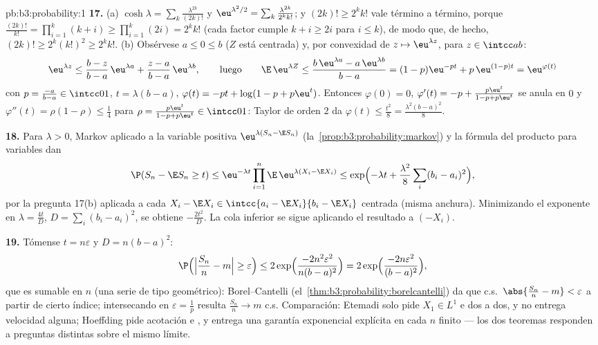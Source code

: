\begin{solution}{pb:b3:probability:1}
\textbf{17.} (a) $\cosh\lambda =
\sum_k\frac{\lambda^{2k}}{(2k)!}$ y $\eu^{\lambda^2/2} =
\sum_k\frac{\lambda^{2k}}{2^kk!}$; y $(2k)! \geq 2^kk!$ vale término a
término, porque $\frac{(2k)!}{k!} =
\prod_{i=1}^k(k + i) \geq \prod_{i=1}^k(2i) = 2^kk!$ (cada factor cumple
$k + i \geq 2i$ para $i \leq k$), de modo que, de hecho,
$(2k)! \geq 2^k(k!)^2 \geq 2^kk!$. (b) Obsérvese $a \leq 0 \leq b$ ($Z$
está centrada) y, por convexidad de $z \mapsto \eu^{\lambda z}$, para
$z \in \intcc ab$:
\[
\eu^{\lambda z} \leq \frac{b - z}{b - a}\,\eu^{\lambda a} +
\frac{z - a}{b - a}\,\eu^{\lambda b},
\qquad\text{luego}\qquad
\E\,\eu^{\lambda Z} \leq \frac{b\,\eu^{\lambda a} -
a\,\eu^{\lambda b}}{b - a}
= (1 - p)\eu^{-pt} + p\,\eu^{(1-p)t} = \eu^{\varphi(t)}
\]
con $p = \frac{-a}{b-a} \in \intcc01$, $t = \lambda(b -
a)$, $\varphi(t) = -pt + \log(1 - p + p\eu^t)$. Entonces
$\varphi(0) = 0$, $\varphi'(t) = -p + \frac{p\eu^t}{1 - p +
p\eu^t}$ se anula en $0$ y $\varphi''(t) = \rho(1 -
\rho) \leq \frac14$ para $\rho = \frac{p\eu^t}{1 - p +
p\eu^t} \in \intcc01$: Taylor de orden $2$ da
$\varphi(t) \leq \frac{t^2}8 = \frac{\lambda^2(b-a)^2}8$.

\textbf{18.} Para $\lambda > 0$, Markov aplicado a la variable positiva
$\eu^{\lambda(S_n - \E S_n)}$ (la~\cref{prop:b3:probability:markov}) y
la fórmula del producto para variables
 dan
\[
\P(S_n - \E S_n \geq t) \leq \eu^{-\lambda
t}\prod_{i=1}^n\E\,\eu^{\lambda(X_i - \E X_i)}
\leq \exp\Bigl(-\lambda t +
\frac{\lambda^2}8\sum_i(b_i - a_i)^2\Bigr),
\]
por la pregunta 17(b) aplicada a cada $X_i - \E X_i
\in \intcc{a_i - \E X_i}{b_i - \E X_i}$ centrada (misma anchura).
Minimizando el exponente en $\lambda = \frac{4t}{D}$, $D =
\sum_i(b_i - a_i)^2$, se obtiene $-\frac{2t^2}D$. La cola inferior se
sigue aplicando el resultado a $(-X_i)$.

\textbf{19.} Tómense $t = n\varepsilon$ y $D = n(b - a)^2$:
\[
\P\Bigl(\Bigl|\frac{S_n}n - m\Bigr| \geq \varepsilon\Bigr)
\leq 2\exp\Bigl(\frac{-2n^2\varepsilon^2}{n(b-a)^2}\Bigr)
= 2\exp\Bigl(\frac{-2n\varepsilon^2}{(b-a)^2}\Bigr),
\]
que es sumable en $n$ (una serie de tipo geométrico): Borel--Cantelli
(el~\cref{thm:b3:probability:borelcantelli}) da que c.s.\
$\abs{\frac{S_n}n - m} < \varepsilon$ a partir de cierto índice;
intersecando en $\varepsilon = \frac1p$ resulta $\frac{S_n}n \to m$ c.s.
Comparación: Etemadi solo pide $X_1 \in L^1$ e
 dos a dos, y no
entrega velocidad alguna; Hoeffding pide acotación e
 , y
entrega una garantía exponencial explícita en cada $n$ finito --- los
dos teoremas responden a preguntas distintas sobre el mismo límite.


\end{solution}

